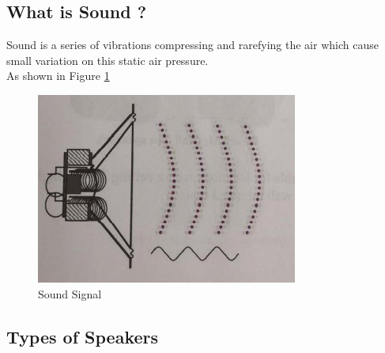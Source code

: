 \documentclass[12pt,fleqn]{book} %
\begin{document}
\subsection{What is Sound ?}
Sound is a series of vibrations compressing and rarefying the air which cause small variation on this static air pressure.
\\ As shown in Figure \ref{fig:hamdy 66}
\begin{figure}[!h]
    \centering
    \includegraphics[width=0.5\linewidth]{hamdy 66.png}
    \caption{Sound Signal}
    \label{fig:hamdy 66}
    \end{figure}
\subsection{Types of Speakers}
\end{document}
